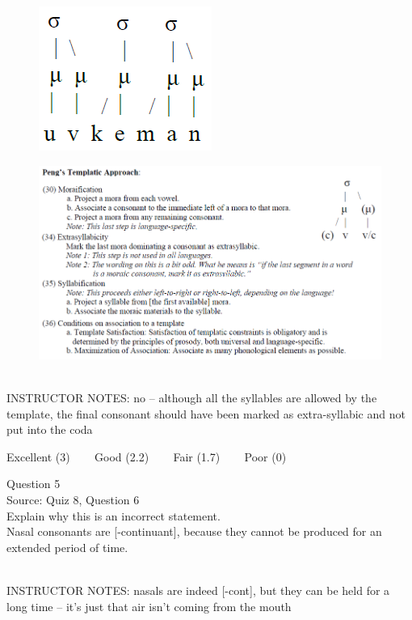 \documentclass[12pt]{article}
\begin{document}
\begin{figure}[H]
\includegraphics{../images/pengtemplate_uvkeman_no.png}
\end{figure}
\begin{figure}[H]
\includegraphics{../images/peng_template_withdiagram.png}
\end{figure}

~\\
INSTRUCTOR NOTES: no -- although all the syllables are allowed by the template, the final consonant should have been marked as extra-syllabic and not put into the coda


\vfill
Excellent (3) ~~~ Good (2.2) ~~~ Fair (1.7) ~~~ Poor (0)
\newpage

{\large Question 5}\\

Source: Quiz 8, Question 6\\

Explain why this is an incorrect statement.\\

Nasal consonants are {[-continuant]}, because they cannot be produced for an extended period of time.


~\\
INSTRUCTOR NOTES: nasals are indeed [-cont], but they can be held for a long time -- it's just that air isn't coming from the mouth
\end{document}
